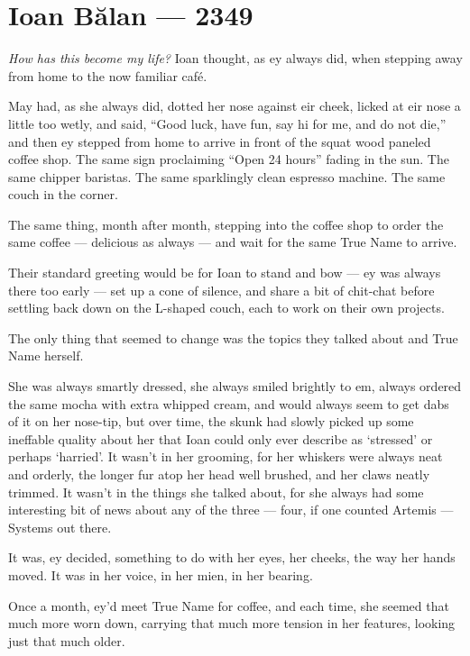 \hypertarget{ioan-bux103lan-2349}{%
\chapter{Ioan Bălan — 2349}\label{ioan-bux103lan-2349}}

\emph{How has this become my life?} Ioan thought, as ey always did, when stepping away from home to the now familiar café.

May had, as she always did, dotted her nose against eir cheek, licked at eir nose a little too wetly, and said, ``Good luck, have fun, say hi for me, and do not die,'' and then ey stepped from home to arrive in front of the squat wood paneled coffee shop. The same sign proclaiming ``Open 24 hours'' fading in the sun. The same chipper baristas. The same sparklingly clean espresso machine. The same couch in the corner.

The same thing, month after month, stepping into the coffee shop to order the same coffee — delicious as always — and wait for the same True Name to arrive.

Their standard greeting would be for Ioan to stand and bow — ey was always there too early — set up a cone of silence, and share a bit of chit-chat before settling back down on the L-shaped couch, each to work on their own projects.

The only thing that seemed to change was the topics they talked about and True Name herself.

She was always smartly dressed, she always smiled brightly to em, always ordered the same mocha with extra whipped cream, and would always seem to get dabs of it on her nose-tip, but over time, the skunk had slowly picked up some ineffable quality about her that Ioan could only ever describe as `stressed' or perhaps `harried'. It wasn't in her grooming, for her whiskers were always neat and orderly, the longer fur atop her head well brushed, and her claws neatly trimmed. It wasn't in the things she talked about, for she always had some interesting bit of news about any of the three — four, if one counted Artemis — Systems out there.

It was, ey decided, something to do with her eyes, her cheeks, the way her hands moved. It was in her voice, in her mien, in her bearing.

Once a month, ey'd meet True Name for coffee, and each time, she seemed that much more worn down, carrying that much more tension in her features, looking just that much older.

